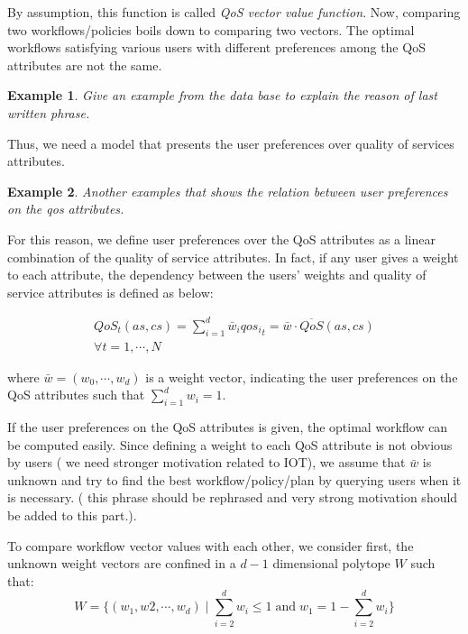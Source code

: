 \documentclass[10pt,journal,compsoc]{IEEEtran}
\newtheorem{example}{Example}
\begin{document}
By assumption, this function is called \emph{QoS vector value function}. Now, comparing two workflows/policies boils down to comparing two vectors. The optimal workflows satisfying various users with different preferences among the QoS attributes are not the same. 

\begin{example}
Give an example from the data base to explain the reason of last written phrase.
\end{example}

Thus, we need a model that presents the user preferences over quality of services attributes. 
\begin{example}
Another examples that shows the relation between user preferences on the qos attributes.
\end{example}

For this reason, we define user preferences over the QoS attributes as a linear combination of the quality of service attributes. In fact, if any user gives a  weight to each attribute, the dependency between the users' weights and quality of service attributes is defined as below:

\begin{multline}
QoS_t(as, cs) = \sum_{i=1}^d \bar{w}_i {qos_i}_t = \bar{w} \cdot \overline{QoS}(as, cs) \\
\forall t = 1, \cdots, N
\end{multline}

where $\bar{w} = (w_0, \cdots, w_d) $ is a weight vector, indicating the user preferences on the QoS attributes such that $\sum_{i=1}^d w_i = 1$.

If the user preferences on the QoS attributes is given, the optimal workflow can be computed easily. Since defining a weight to each QoS attribute is not obvious by users ({\color{red} we need stronger motivation related to IOT}), we assume that $\bar{w}$ is unknown and try to find the best workflow/policy/plan by querying users when it is necessary. ({\color{red} this phrase should be rephrased and very strong motivation should be added to this part.}). 

To compare workflow vector values with each other, we consider first, the unknown weight vectors are confined in a $d-1$ dimensional polytope $W$ such that:
\begin{equation}
W = \{ (w_1, w2, \cdots, w_d) \; | \; \sum_{i=2}^d w_i \leq 1 \; \text{and} \; w_1 = 1-\sum_{i=2}^d w_i \}
\end{equation}
\end{document}
